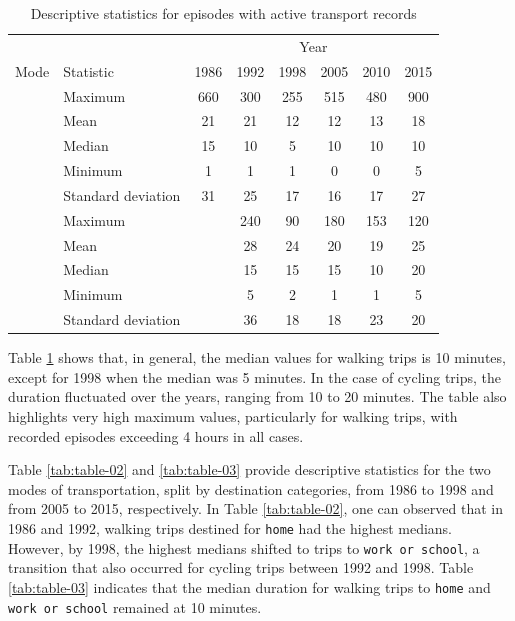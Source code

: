\documentclass[Royal,times,sageh]{sagej}
\begin{document}
\begin{longtable}[t]{>{}llcccccc}
\caption{\label{tab:table-01}\label{tab:table-01}Descriptive statistics for episodes with active transport records}\\
\toprule
\multicolumn{2}{c}{ } & \multicolumn{6}{c}{Year} \\
\cmidrule(l{3pt}r{3pt}){3-8}
Mode & Statistic & 1986 & 1992 & 1998 & 2005 & 2010 & 2015\\
\midrule
 & Maximum & 660 & 300 & 255 & 515 & 480 & 900\\
\nopagebreak
 & Mean & 21 & 21 & 12 & 12 & 13 & 18\\
\nopagebreak
 & Median & 15 & 10 & 5 & 10 & 10 & 10\\
\nopagebreak
 & Minimum & 1 & 1 & 1 & 0 & 0 & 5\\
\nopagebreak
\multirow[t]{-5}{*}{\raggedright\arraybackslash \textbf{Walking}} & Standard deviation & 31 & 25 & 17 & 16 & 17 & 27\\
\cmidrule{1-8}\pagebreak[0]
 & Maximum &  & 240 & 90 & 180 & 153 & 120\\
\nopagebreak
 & Mean &  & 28 & 24 & 20 & 19 & 25\\
\nopagebreak
 & Median &  & 15 & 15 & 15 & 10 & 20\\
\nopagebreak
 & Minimum &  & 5 & 2 & 1 & 1 & 5\\
\nopagebreak
\multirow[t]{-5}{*}{\raggedright\arraybackslash \textbf{Cycling}} & Standard deviation &  & 36 & 18 & 18 & 23 & 20\\
\bottomrule
\end{longtable}
\endgroup{}

Table \ref{tab:table-01} shows that, in general, the median values for
walking trips is 10 minutes, except for 1998 when the median was 5
minutes. In the case of cycling trips, the duration fluctuated over the
years, ranging from 10 to 20 minutes. The table also highlights very
high maximum values, particularly for walking trips, with recorded
episodes exceeding 4 hours in all cases.

Table \ref{tab:table-02} and \ref{tab:table-03} provide descriptive
statistics for the two modes of transportation, split by destination
categories, from 1986 to 1998 and from 2005 to 2015, respectively. In
Table \ref{tab:table-02}, one can observed that in 1986 and 1992,
walking trips destined for \texttt{home} had the highest medians.
However, by 1998, the highest medians shifted to trips to
\texttt{work\ or\ school}, a transition that also occurred for cycling
trips between 1992 and 1998. Table \ref{tab:table-03} indicates that the
median duration for walking trips to \texttt{home} and
\texttt{work\ or\ school} remained at 10 minutes.
\end{document}
